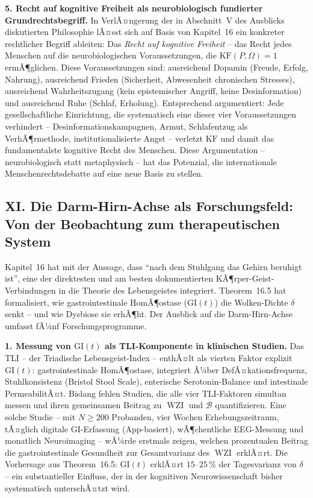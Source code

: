 ﻿\documentclass[12pt,a4paper]{report}
\theoremstyle{plain}
\theoremstyle{definition}
\theoremstyle{remark}
\DeclareMathOperator{\WZI}{WZI}
\begin{document}
	\textbf{5. Recht auf kognitive Freiheit als neurobiologisch
		fundierter Grundrechtsbegriff.}
	In VerlÃ¤ngerung der in Abschnitt~V des Ausblicks diskutierten
	Philosophie lÃ¤sst sich auf Basis von Kapitel~16 ein
	konkreter rechtlicher Begriff ableiten:
	Das \emph{Recht auf kognitive Freiheit} -- das Recht jedes Menschen
	auf die neurobiologischen Voraussetzungen, die $\mathrm{KF}(P,\Omega) = 1$
	ermÃ¶glichen.
	Diese Voraussetzungen sind: ausreichend Dopamin (Freude, Erfolg, Nahrung),
	ausreichend Frieden (Sicherheit, Abwesenheit chronischen Stresses),
	ausreichend Wahrheitszugang (kein epistemischer Angriff, keine
	Desinformation) und ausreichend Ruhe (Schlaf, Erholung).
	Entsprechend argumentiert: Jede gesellschaftliche Einrichtung,
	die systematisch eine dieser vier Voraussetzungen verhindert --
	Desinformationskampagnen, Armut, Schlafentzug als
	VerhÃ¶rmethode, institutionalisierte Angst -- verletzt
	$\mathrm{KF}$ und damit das fundamentalste kognitive Recht des Menschen.
	Diese Argumentation -- neurobiologisch statt metaphysisch --
	hat das Potenzial, die internationale Menschenrechtsdebatte
	auf eine neue Basis zu stellen.

	\subsection*{XI. Die Darm-Hirn-Achse als Forschungsfeld:
		Von der Beobachtung zum therapeutischen System}

	Kapitel~16 hat mit der Aussage, dass ``nach dem Stuhlgang das
	Gehirn beruhigt ist'', eine der direktesten und am besten
	dokumentierten KÃ¶rper-Geist-Verbindungen in die Theorie
	des Lebensgeistes integriert. Theorem~16.5 hat formalisiert,
	wie gastrointestinale HomÃ¶ostase ($\mathrm{GI}(t)$) die
	Wolken-Dichte $\delta$ senkt -- und wie Dysbiose sie erhÃ¶ht.
	Der Ausblick auf die Darm-Hirn-Achse umfasst fÃ¼nf Forschungsprogramme.

	\textbf{1. Messung von $\mathrm{GI}(t)$ als TLI-Komponente
		in klinischen Studien.}
	Das TLI -- der Triadische Lebensgeist-Index -- enthÃ¤lt als
	vierten Faktor explizit $\mathrm{GI}(t)$: gastrointestinale
	HomÃ¶ostase, integriert Ã¼ber DefÃ¤kationsfrequenz, Stuhlkonsistenz
	(Bristol Stool Scale), enterische Serotonin-Balance und
	intestinale PermeabilitÃ¤t.
	Bislang fehlen Studien, die alle vier TLI-Faktoren simultan
	messen und ihren gemeinsamen Beitrag zu $\WZI$ und $\mathcal{B}$
	quantifizieren. Eine solche Studie -- mit $N \geq 200$ Probanden,
	vier Wochen Erhebungszeitraum, tÃ¤glich digitale GI-Erfassung
	(App-basiert), wÃ¶chentliche EEG-Messung und monatlich
	Neuroimaging -- wÃ¼rde erstmals zeigen, welchen prozentualen
	Beitrag die gastrointestinale Gesundheit zur Gesamtvarianz
	des $\WZI$ erklÃ¤rt. Die Vorhersage aus Theorem~16.5:
	$\mathrm{GI}(t)$ erklÃ¤rt $15$--$25\,\%$ der Tagesvarianz von $\delta$
	-- ein substantieller Einfluss, der in der kognitiven Neurowissenschaft
	bisher systematisch unterschÃ¤tzt wird.
\end{document}
